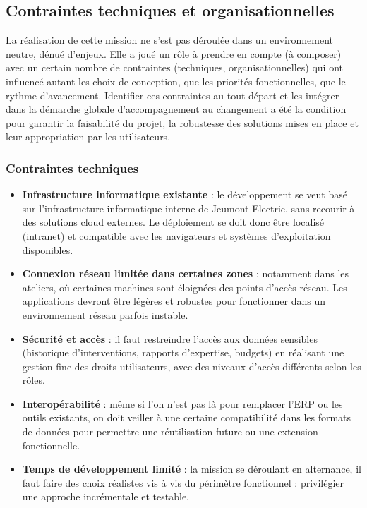 \documentclass[11pt,a4paper]{article}
\begin{document}
\subsection{Contraintes techniques et organisationnelles}

La réalisation de cette mission ne s’est pas déroulée dans un environnement neutre, dénué d’enjeux. Elle a joué un rôle à prendre en compte (à composer) avec un certain nombre de contraintes (techniques, organisationnelles) qui ont influencé autant les choix de conception, que les priorités fonctionnelles, que le rythme d’avancement. Identifier ces contraintes au tout départ et les intégrer dans la démarche globale d’accompagnement au changement a été la condition pour garantir la faisabilité du projet, la robustesse des solutions mises en place et leur appropriation par les utilisateurs.


\subsubsection{Contraintes techniques}

\begin{itemize}
    \item \textbf{Infrastructure informatique existante} : le développement se veut basé sur l’infrastructure informatique interne de Jeumont Electric, sans recourir à des solutions cloud externes. Le déploiement se doit donc être localisé (intranet) et compatible avec les navigateurs et systèmes d’exploitation disponibles.

    \item \textbf{Connexion réseau limitée dans certaines zones} :  notamment dans les ateliers, où certaines machines sont éloignées des points d’accès réseau. Les applications devront être légères et robustes pour fonctionner dans un environnement réseau parfois instable.

    \item \textbf{Sécurité et accès} : il faut restreindre l’accès aux données sensibles (historique d’interventions, rapports d’expertise, budgets) en réalisant une gestion fine des droits utilisateurs, avec des niveaux d’accès différents selon les rôles.
    
    \item \textbf{Interopérabilité} : même si l’on n’est pas là pour remplacer l’ERP ou les outils existants, on doit veiller à une certaine compatibilité dans les formats de données pour permettre une réutilisation future ou une extension fonctionnelle.

    \item \textbf{Temps de développement limité} : la mission se déroulant en alternance, il faut faire des choix réalistes vis à vis du périmètre fonctionnel : privilégier une approche incrémentale et testable.
\end{itemize}
\end{document}
